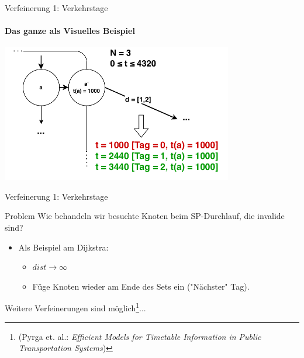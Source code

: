 \begin{frame}{Verfeinerung 1: Verkehrstage}
\framesubtitle{Das ganze als Visuelles Beispiel}
	\begin{center}
		\includegraphics[height=6cm]{images/time-expanded/verkehrstage-beispiel.pdf} 
	\end{center}
\end{frame}


\begin{frame}{Verfeinerung 1: Verkehrstage}
	\begin{block}{Problem}
		Wie behandeln wir besuchte Knoten beim SP-Durchlauf, die invalide sind?
	\end{block}

	\begin{itemize}
		\item Als Beispiel am Dijkstra: 
		\begin{itemize}
			\item $dist \rightarrow \infty$
			\item Füge Knoten wieder am Ende des Sets ein ("{}Nächster"{} Tag).
		\end{itemize}
	\end{itemize}
	\vspace{7em}
	Weitere Verfeinerungen sind möglich\footnote{(Pyrga et. al.: \textit{Efficient Models for Timetable Information in Public Transportation Systems})}...
\end{frame}


